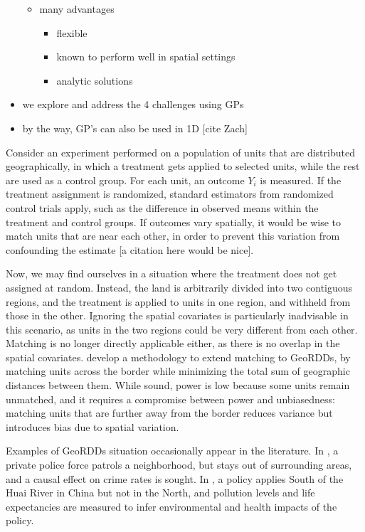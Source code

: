 \documentclass[letter]{article}
\providecommand{\tightlist}{%
      \setlength{\itemsep}{0pt}\setlength{\parskip}{0pt}}
\providecommand{\tightlist}{%
  	  \setlength{\itemsep}{0pt}\setlength{\parskip}{0pt}}
\renewcommand{\cite}[1]{\citep{#1}}
\begin{document}
\begin{itemize}
  \begin{itemize}
  \tightlist
  \item
    many advantages

    \begin{itemize}
    \tightlist
    \item
      flexible
    \item
      known to perform well in spatial settings
    \item
      analytic solutions
    \end{itemize}
  \end{itemize}
\item
  we explore and address the 4 challenges using GPs
\item
  by the way, GP's can also be used in 1D {[}cite Zach{]}
\end{itemize}
    


    	Consider an experiment performed on a population of units that are distributed geographically,
in which a treatment gets applied to selected units, while the rest are used as a control group.
For each unit, an outcome \(Y_i\) is measured.
If the treatment assignment is randomized, standard estimators from randomized control trials apply, such as the difference in observed means within the treatment and control groups.
If outcomes vary spatially, it would be wise to match units that are near each other, in order to prevent this variation from confounding the estimate {[}a citation here would be nice{]}.

Now, we may find ourselves in a situation where the treatment does not get assigned at random.
Instead, the land is arbitrarily divided into two contiguous regions, and the treatment is applied to units in one region, and withheld from those in the other.
Ignoring the spatial covariates is particularly inadvisable in this scenario, as units in the two regions could be very different from each other.
Matching is no longer directly applicable either, as there is no overlap in the spatial covariates.
\cite{keele2015enhancing} develop a methodology to extend matching to GeoRDDs, by matching units across the border while minimizing the total sum of geographic distances between them.
While sound, power is low because some units remain unmatched, and it requires a compromise between power and unbiasedness: matching units that are further away from the border reduces variance but introduces bias due to spatial variation.

Examples of GeoRDDs situation occasionally appear in the literature. In \cite{macdonald2015effect}, a private police force patrols a neighborhood, but stays out of surrounding areas, and a causal effect on crime rates is sought. In \cite{chen2013evidence}, a policy applies South of the Huai River in China but not in the North, and pollution levels and life expectancies are measured to infer environmental and health impacts of the policy.
\end{document}
